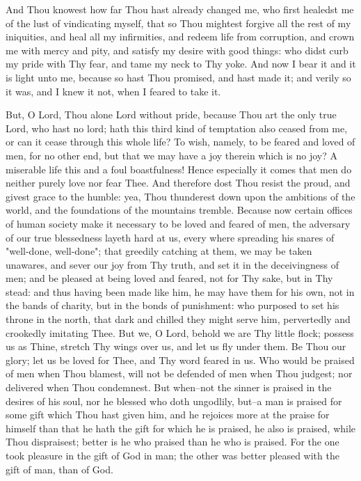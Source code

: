 \documentclass[b5paper,openright,12pt,twoside]{book}
\begin{document}
And Thou knowest how far Thou hast already changed me, who first
healedst me of the lust of vindicating myself, that so Thou mightest
forgive all the rest of my iniquities, and heal all my infirmities,
and redeem life from corruption, and crown me with mercy and pity, and
satisfy my desire with good things: who didst curb my pride with Thy
fear, and tame my neck to Thy yoke. And now I bear it and it is light
unto me, because so hast Thou promised, and hast made it; and verily so
it was, and I knew it not, when I feared to take it.

But, O Lord, Thou alone Lord without pride, because Thou art the only
true Lord, who hast no lord; hath this third kind of temptation also
ceased from me, or can it cease through this whole life? To wish,
namely, to be feared and loved of men, for no other end, but that we
may have a joy therein which is no joy? A miserable life this and a foul
boastfulness! Hence especially it comes that men do neither purely love
nor fear Thee. And therefore dost Thou resist the proud, and givest
grace to the humble: yea, Thou thunderest down upon the ambitions of the
world, and the foundations of the mountains tremble. Because now certain
offices of human society make it necessary to be loved and feared of
men, the adversary of our true blessedness layeth hard at us, every
where spreading his snares of "well-done, well-done"; that greedily
catching at them, we may be taken unawares, and sever our joy from Thy
truth, and set it in the deceivingness of men; and be pleased at being
loved and feared, not for Thy sake, but in Thy stead: and thus having
been made like him, he may have them for his own, not in the bands of
charity, but in the bonds of punishment: who purposed to set his throne
in the north, that dark and chilled they might serve him, pervertedly
and crookedly imitating Thee. But we, O Lord, behold we are Thy little
flock; possess us as Thine, stretch Thy wings over us, and let us fly
under them. Be Thou our glory; let us be loved for Thee, and Thy word
feared in us. Who would be praised of men when Thou blamest, will not be
defended of men when Thou judgest; nor delivered when Thou condemnest.
But when--not the sinner is praised in the desires of his soul, nor he
blessed who doth ungodlily, but--a man is praised for some gift which
Thou hast given him, and he rejoices more at the praise for himself than
that he hath the gift for which he is praised, he also is praised, while
Thou dispraisest; better is he who praised than he who is praised. For
the one took pleasure in the gift of God in man; the other was better
pleased with the gift of man, than of God.
\end{document}
